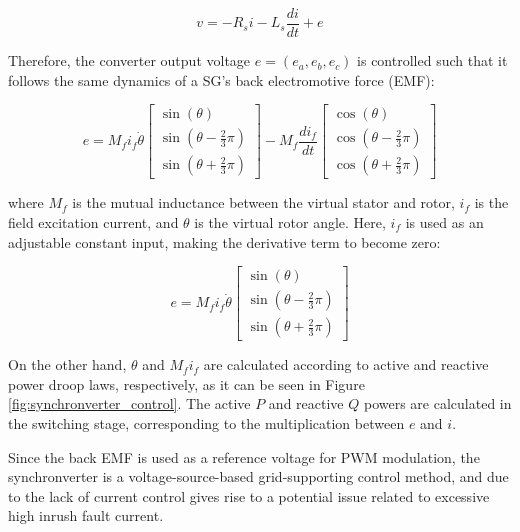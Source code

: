 \begin{equation*}
    v = -R_s i - L_s \frac{di}{dt} + e
\end{equation*}

Therefore, the converter output voltage $e = (e_a, e_b, e_c)$ is controlled such
that it follows the same dynamics of a SG's back electromotive force (EMF):

\begin{equation*}
    e = M_f i_f \dot{\theta} \begin{bmatrix} \sin{(\theta)} \\ \sin{(\theta - \frac{2}{3}\pi)} \\ \sin{(\theta + \frac{2}{3}\pi)}\end{bmatrix} - M_f \frac{di_f}{dt} \begin{bmatrix} \cos{(\theta)} \\ \cos{(\theta - \frac{2}{3}\pi)} \\ \cos{(\theta + \frac{2}{3}\pi)}\end{bmatrix}
\end{equation*}

\noindent where $M_f$ is the mutual inductance between the virtual stator and
rotor, $i_f$ is the field excitation current, and $\theta$ is the virtual rotor
angle. Here, $i_f$ is used as an adjustable constant input, making the
derivative term to become zero:

\begin{equation*}
    e = M_f i_f \dot{\theta} \begin{bmatrix} \sin{(\theta)} \\ \sin{(\theta - \frac{2}{3}\pi)} \\ \sin{(\theta + \frac{2}{3}\pi)}\end{bmatrix}
\end{equation*}

On the other hand, $\theta$ and $M_f i_f$ are calculated according to active and
reactive power droop laws, respectively, as it can be seen in Figure
\ref{fig:synchronverter_control}. The active $P$ and reactive $Q$ powers are
calculated in the switching stage, corresponding to the multiplication between
$e$ and $i$.

Since the back EMF is used as a reference voltage for PWM modulation, the
synchronverter is a voltage-source-based grid-supporting control method, and due
to the lack of current control gives rise to a potential issue related to
excessive high inrush fault current\cite{shuai2017characteristics}.

